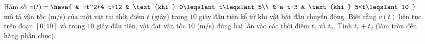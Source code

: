 \begin{ex}%
	 Hàm số
	$v(t)=\heva{ 
	& -t^2+4 t+12 & \text{khi } 0\leqslant t\leqslant  5\\
	& a t-3 &  \text{khi } 5<t\leqslant 10
	}$ mô tả vận tốc (m/s) của một  vật tại thời điểm $t$ (giây) trong $10$ giây đầu tiên kể từ khi vật bắt đầu chuyển động. Biết rằng $v(t)$ liên tục trên đoạn $[0;10]$ và trong $10$ giây đầu tiên, vật đạt vận tốc $10$ (m/s) đúng hai lần vào các thời điểm $t_1$ và $t_2$. Tính $t_1+t_2$ (làm tròn đến hàng phần chục).
\end{ex}

